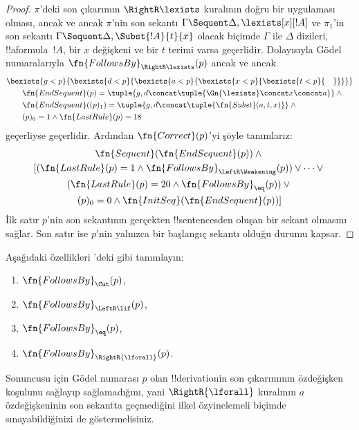 \begin{proof}
$\pi$'deki son çıkarımın $\RightR\lexists$ kuralının doğru bir uygulaması
olması, ancak ve ancak $\pi$'nin son sekantı
$\Gamma \Sequent \Delta, \lexists[x][!A]$ ve $\pi_1$'in son sekantı
$\Gamma \Sequent \Delta, \Subst{!A}{t}{x}$ olacak biçimde $\Gamma$ ile
$\Delta$ dizileri, !!a{formula}~$!A$, bir $x$ değişkeni ve bir $t$ terimi
varsa geçerlidir. Dolayısıyla Gödel numaralarıyla
$\fn{FollowsBy}_{\RightR\lexists}(p)$ ancak ve ancak
\begin{align*}
  & \bexists{g<p}{\bexists{d<p}{\bexists{a<p}{\bexists{x<p}{\bexists{t<p}{\quad}}}}}\\
  & \qquad \fn{EndSequent}(p) =
  \tuple{
    g,
    d \concat \tuple{\Gn{\lexists} \concat x \concat a}
  } \land {}\\
  & \qquad \fn{EndSequent}((p)_1) =
  \tuple{
    g,
    d \concat \tuple{\fn{Subst}(a, t, x)}
  } \land {}\\
  & \qquad (p)_0 = 1 \land \fn{LastRule}(p) = 18
\end{align*}
geçerliyse geçerlidir. Ardından $\fn{Correct}(p)$'yi şöyle tanımlarız:
\begin{multline*}
  \fn{Sequent}(\fn{EndSequent}(p)) \land {}\\
  [(\fn{LastRule}(p) = 1 \land
  \fn{FollowsBy}_{\LeftR\Weakening}(p)) \lor \dots \lor {}\\
  (\fn{LastRule}(p) = 20 \land \fn{FollowsBy}_{\eq}(p)) \lor {}\\
  (p)_0 = 0 \land \fn{InitSeq}(\fn{EndSequent}(p))]
\end{multline*}
İlk satır $p$'nin son sekantının gerçekten !!{sentence}s{}den oluşan bir
sekant olmasını sağlar. Son satır ise $p$'nin yalnızca bir başlangıç sekantı
olduğu durumu kapsar.
\end{proof}

\begin{prob}
  Aşağıdaki özellikleri 'deki gibi
  tanımlayın:
  \begin{enumerate}
  \item $\fn{FollowsBy}_{\Cut}(p)$,
  \item $\fn{FollowsBy}_{\LeftR\lif}(p)$,
  \item $\fn{FollowsBy}_{\eq}(p)$,
  \item $\fn{FollowsBy}_{\RightR{\lforall}}(p)$.
  \end{enumerate}
  Sonuncusu için Gödel numarası $p$ olan !!{derivation}{}in son çıkarımının
  özdeğişken koşulunu sağlayıp sağlamadığını, yani
  $\RightR{\lforall}$ kuralının $a$ özdeğişkeninin son sekantta geçmediğini
  ilkel özyinelemeli biçimde sınayabildiğinizi de göstermelisiniz.
\end{prob}

